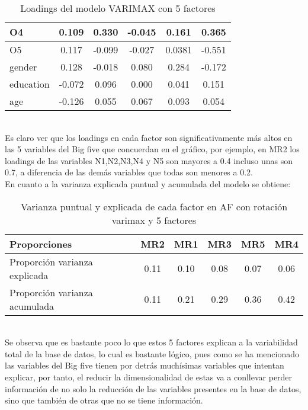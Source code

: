 \documentclass{report}
\begin{document}
\begin{table}[h!]
\begin{center}
\begin{tabular}{|l|c|c|c|c|c|}
\hline
O4    &     0.109&  0.330 &-0.045 & 0.161 & 0.365\\
\hline
O5    &     0.117& -0.099 &-0.027 &0.0381 &-0.551\\
\hline
gender&     0.128& -0.018 & 0.080 &0.284 &-0.172\\
\hline
education& -0.072&  0.096 & 0.000 & 0.041&  0.151\\
\hline
age     &  -0.126&  0.055 & 0.067 &0.093 &0.054\\
\hline
    \end{tabular}
  \end{center}
  \caption{Loadings del modelo VARIMAX con 5 factores}
\end{table}\\
Es claro ver que los loadings en cada factor son significativamente más altos en las 5 variables del Big five que concuerdan en el gráfico, por ejemplo, en MR2 los loadings de las variables N1,N2,N3,N4 y N5 son mayores a 0.4 incluso unas son 0.7, a diferencia de las demás variables que todas son menores a 0.2.\\

En cuanto a la varianza explicada puntual y acumulada del modelo se obtiene:\\
\vspace{4cm}

\begin{table}[h!]
  \begin{center}
    \label{tab:table1}
    \begin{tabular}{|l|c|c|c|c|c|} 
    \hline
      \textbf{Proporciones} &\textbf{MR2} & \textbf{MR1} & \textbf{MR3} &\textbf{MR5} &\textbf{MR4}\\
      \hline
Proporción varianza explicada  &    0.11 &0.10& 0.08& 0.07& 0.06\\
\hline
Proporción varianza acumulada  &   0.11 &0.21& 0.29& 0.36 &0.42 \\
\hline
    \end{tabular}
  \end{center}
  \caption{Varianza puntual y explicada de cada factor en AF con rotación varimax y 5 factores}
\end{table}\\

Se observa que es bastante poco lo que estos 5 factores explican a la variabilidad total de la base de datos, lo cual es bastante lógico, pues como se ha mencionado las variables del Big five tienen por detrás muchísimas variables que intentan explicar, por tanto, el reducir la dimensionalidad de estas va a conllevar perder información de no solo la reducción de las variables presentes en la base de datos, sino que también de otras que no se tiene información.\\
\end{document}
